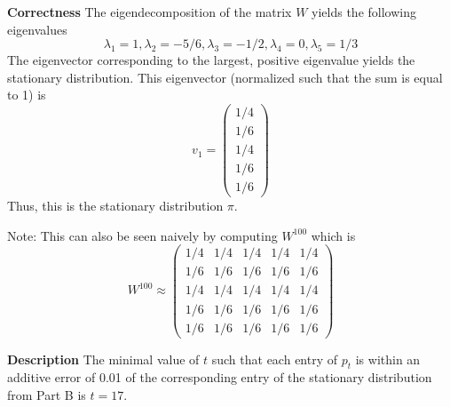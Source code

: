 \documentclass[12pt,twoside]{article}
\begin{document}
\begin{problems}
\begin{problemparts}
{\bf Correctness} The eigendecomposition of the matrix $W$ yields the
following eigenvalues
$$ \lambda_1 = 1, \lambda_2 = -5/6, \lambda_3 = -1/2, \lambda_4 = 0,
\lambda_5 = 1/3 $$
The eigenvector corresponding to the largest, positive eigenvalue yields the
stationary distribution. This eigenvector (normalized such that the sum is
equal to 1) is
$$ v_1 = \begin{pmatrix}
  1/4 \\
  1/6 \\
  1/4 \\
  1/6 \\
  1/6
\end{pmatrix} $$
Thus, this is the stationary distribution $\pi$.

Note: This can also be seen naively by computing $W^{100}$ which is
$$ W^{100} \approx \begin{pmatrix}
  1/4 & 1/4 & 1/4 & 1/4 & 1/4 \\
  1/6 & 1/6 & 1/6 & 1/6 & 1/6 \\
  1/4 & 1/4 & 1/4 & 1/4 & 1/4 \\
  1/6 & 1/6 & 1/6 & 1/6 & 1/6 \\
  1/6 & 1/6 & 1/6 & 1/6 & 1/6
\end{pmatrix} $$

\problempart %

{\bf Description} The minimal value of $t$ such that each entry of $p_t$ is
within an additive error of 0.01 of the corresponding entry of the stationary
distribution from Part B is $t = 17$.


\end{problemparts}
\end{problems}
\end{document}
